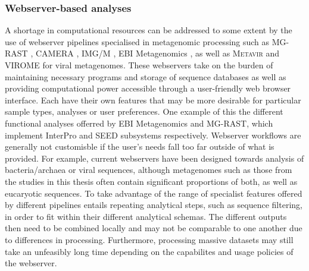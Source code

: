 \subsubsection{Webserver-based analyses}
A shortage in computational resources can be addressed to some extent by the use of webserver pipelines specialised in metagenomic processing such as \ac{MG-RAST} \cite{Meyer2008}, \ac{CAMERA} \cite{Sun2011}, \ac{IMG/M} \cite{Markowitz2008, Markowitz2012}, EBI Metagenomics \cite{Hunter2012}, as well as \textsc{Metavir} \cite{Roux2011} and \ac{VIROME} \cite{Wommack2012} for viral metagenomes.
These webservers take on the burden of maintaining necessary programs and storage of sequence databases as well as providing computational power accessible through a user-friendly web browser interface.
Each have their own features that may be more desirable for particular sample types, analyses or user preferences.
One example of this the different functional analyses offerred by EBI Metagenomics and \ac{MG-RAST}, which implement InterPro and SEED subsystems respectively.
Webserver workflows are generally not customisble if the user's needs fall too far outside of what is provided.
For example, current webservers have been designed towards analysis of bacteria/archaea or viral sequences, although metagenomes such as those from the studies in this thesis often contain significant proportions of both, as well as eucaryotic sequences.
To take advantage of the range of specialist features offered by different pipelines entails repeating analytical steps, such as sequence filtering, in order to fit within their different analytical schemas. 
The different outputs then need to be combined locally and may not be comparable to one another due to differences in processing.
Furthermore, processing massive datasets may still take an unfeasibly long time depending on the capabilites and usage policies of the webserver.

